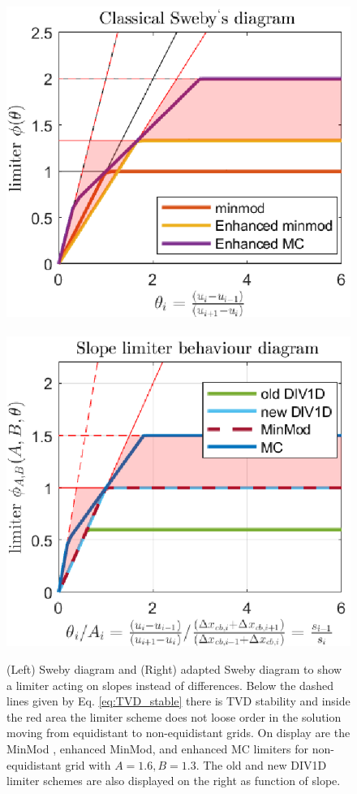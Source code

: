 \documentclass[amsmath,amssymb,a4]{revtex4-2}
\begin{document}
\begin{figure}
    \centering
    \includegraphics{limiters_original_sweby.eps}~
    \includegraphics{limiters_adapted_sweby.eps}
    \caption{(Left) Sweby diagram and (Right) adapted Sweby diagram to show a limiter acting on slopes instead of differences.  Below the dashed lines given by Eq. \ref{eq:TVD_stable} there is TVD stability and inside the red area the limiter scheme does not loose order in the solution moving from equidistant to non-equidistant grids. On display are the MinMod , enhanced MinMod, and enhanced MC limiters for non-equidistant grid with $A=1.6,B=1.3$. The old and new DIV1D limiter schemes are also displayed on the right as function of slope.}
    \label{fig:limiters}
\end{figure}
\end{document}
